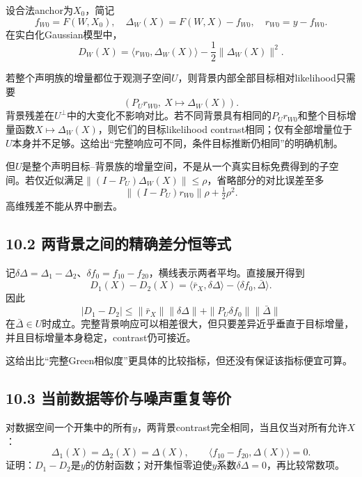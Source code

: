 \documentclass[
  10pt,
  a4paper,
]{article}
\begin{document}
设合法anchor为\(X_0\)，简记 \[
f_{W0}=F(W,X_0),\quad
\Delta_W(X)=F(W,X)-f_{W0},\quad
r_{W0}=y-f_{W0}.
\] 在实白化Gaussian模型中， \[
\boxed{
D_W(X)=
\langle r_{W0},\Delta_W(X)\rangle
-\frac12\|\Delta_W(X)\|^2.
}
\]

若整个声明族的增量都位于观测子空间\(U\)，则背景内部全部目标相对likelihood只需要
\[
\left(P_U r_{W0},\ X\mapsto\Delta_W(X)\right).
\]
背景残差在\(U^\perp\)中的大变化不影响对比。若不同背景具有相同的\(P_Ur_{W0}\)和整个目标增量函数\(X\mapsto\Delta_W(X)\)，则它们的目标likelihood
contrast相同；仅有全部增量位于\(U\)本身并不足够。这给出``完整响应可不同，条件目标推断仍相同''的明确机制。

但\(U\)是整个声明目标--背景族的增量空间，不是从一个真实目标免费得到的子空间。若仅近似满足\(\|(I-P_U)\Delta_W(X)\|\le\rho\)，省略部分的对比误差至多
\[
\|(I-P_U)r_{W0}\|\rho+\tfrac12\rho^2.
\] 高维残差不能从界中删去。

\hypertarget{ux4e24ux80ccux666fux4e4bux95f4ux7684ux7cbeux786eux5deeux5206ux6052ux7b49ux5f0f}{%
\subsection{10.2
两背景之间的精确差分恒等式}\label{ux4e24ux80ccux666fux4e4bux95f4ux7684ux7cbeux786eux5deeux5206ux6052ux7b49ux5f0f}}

记\(\delta\Delta=\Delta_1-\Delta_2\)、\(\delta f_0=f_{10}-f_{20}\)，横线表示两者平均。直接展开得到
\[
\boxed{
D_1(X)-D_2(X)
=
\langle\bar r_X,\delta\Delta\rangle
-\langle\delta f_0,\bar\Delta\rangle.
}
\] 因此 \[
|D_1-D_2|
\le
\|\bar r_X\|\|\delta\Delta\|
+\|P_U\delta f_0\|\|\bar\Delta\|
\]
在\(\bar\Delta\in U\)时成立。完整背景响应可以相差很大，但只要差异近乎垂直于目标增量，并且目标增量本身稳定，contrast仍可接近。

这给出比``完整Green相似度''更具体的比较指标，但还没有保证该指标便宜可算。

\hypertarget{ux5f53ux524dux6570ux636eux7b49ux4ef7ux4e0eux566aux58f0ux91cdux590dux7b49ux4ef7}{%
\subsection{10.3
当前数据等价与噪声重复等价}\label{ux5f53ux524dux6570ux636eux7b49ux4ef7ux4e0eux566aux58f0ux91cdux590dux7b49ux4ef7}}

对数据空间一个开集中的所有\(y\)，两背景contrast完全相同，当且仅当对所有允许\(X\)：
\[
\boxed{
\Delta_1(X)=\Delta_2(X)=\Delta(X),\qquad
\langle f_{10}-f_{20},\Delta(X)\rangle=0.
}
\]
证明：\(D_1-D_2\)是\(y\)的仿射函数；对开集恒零迫使\(y\)系数\(\delta\Delta=0\)，再比较常数项。
\end{document}
